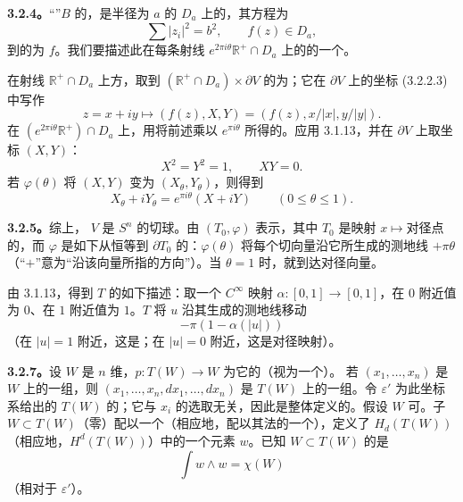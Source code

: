\textbf{3.2.4。}“”$B$ 的，是半径为 $a$ 的 $D_a$ 上的，其方程为
\[
 \sum|z_i|^2=b^2,\qquad f(z)\in D_a,
\]
到的为 $f$。我们要描述此在每条射线 $e^{2\pi i\theta}\mathbb R^+\cap D_a$ 上的的一个。

在射线 $\mathbb R^+\cap D_a$ 上方，取到 $(\mathbb R^+\cap D_a)\times\partial V$ 的为；它在 $\partial V$ 上的坐标 (3.2.2.3) 中写作
\[
 z=x+iy\longmapsto(f(z),X,Y)=(f(z),x/|x|,y/|y|).
\]
在 $(e^{2\pi i\theta}\mathbb R^+)\cap D_a$ 上，用将前述乘以 $e^{\pi i\theta}$ 所得的。应用 3.1.13，并在 $\partial V$ 上取坐标 $(X,Y)$：
\[
 X^2=Y^2=1,\qquad XY=0.\tag{3.2.4.1}
\]
若 $\varphi(\theta)$ 将 $(X,Y)$ 变为 $(X_\theta,Y_\theta)$，则得到
\[
 X_\theta+iY_\theta=e^{\pi i\theta}(X+iY)\qquad(0\leq\theta\leq1).\tag{3.2.4.2}
\]

\textbf{3.2.5。}综上， $V$ 是 $S^n$ 的切球。由 $(T_0,\varphi)$ 表示，其中 $T_0$ 是映射 $x\mapsto\text{对径点}$ 的，而 $\varphi$ 是如下从恒等到 $\partial T_0$ 的：$\varphi(\theta)$ 将每个切向量沿它所生成的测地线 $+\pi\theta$（“$+$”意为“沿该向量所指的方向”）。当 $\theta=1$ 时，就到达对径向量。

由 3.1.13，得到 $T$ 的如下描述：取一个 $C^\infty$ 映射 $\alpha:[0,1]\to[0,1]$，在 $0$ 附近值为 $0$、在 $1$ 附近值为 $1$。$T$ 将 $u$ 沿其生成的测地线移动
\[
 -\pi(1-\alpha(|u|))
\]
（在 $|u|=1$ 附近，这是；在 $|u|=0$ 附近，这是对径映射）。

\textbf{3.2.7。}设 $W$ 是 $n$ 维，$p:T(W)\to W$ 为它的（视为一个）。
若 $(x_1,\ldots,x_n)$ 是 $W$ 上的一组，则 $(x_1,\ldots,x_n,dx_1,\ldots,dx_n)$ 是 $T(W)$ 上的一组。令 $\varepsilon'$ 为此坐标系给出的 $T(W)$ 的；它与 $x_i$ 的选取无关，因此是整体定义的。假设 $W$ 可。子 $W\subset T(W)$（零）配以一个（相应地，配以其法的一个），定义了 $H_d(T(W))$（相应地，$H^d(T(W))$）中的一个元素 $w$。已知 $W\subset T(W)$ 的是 
\[
 \int w\wedge w=\chi(W)
\]
（相对于 $\varepsilon'$）。

